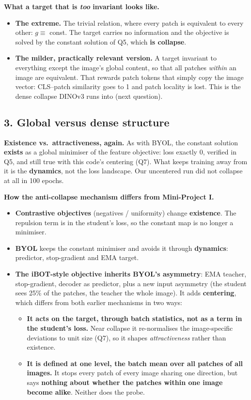 \documentclass[11pt]{article}
\begin{document}
\textbf{What a target that is \emph{too} invariant looks like.}
\begin{itemize}
  \item \textbf{The extreme.} The trivial relation, where every patch is equivalent to every other: $g\equiv$ const. The target carries no information and the objective is solved by the constant solution of Q5, which \textbf{is collapse}.
  \item \textbf{The milder, practically relevant version.} A target invariant to everything except the image's global content, so that all patches \emph{within} an image are equivalent. That rewards patch tokens that simply copy the image vector: CLS--patch similarity goes to 1 and patch locality is lost. This is the dense collapse DINOv3 runs into (next question).
\end{itemize}

\subsection*{3. Global versus dense structure}
\textbf{Existence vs.\ attractiveness, again.} As with BYOL, the constant solution \textbf{exists} as a global minimiser of the feature objective: loss exactly 0, verified in Q5, and still true with this code's centering (Q7). What keeps training away from it is the \textbf{dynamics}, not the loss landscape. Our uncentered run did not collapse at all in 100 epochs.

\textbf{How the anti-collapse mechanism differs from Mini-Project I.}
\begin{itemize}
  \item \textbf{Contrastive objectives} (negatives / uniformity) change \textbf{existence}. The repulsion term is in the student's loss, so the constant map is no longer a minimiser.
  \item \textbf{BYOL} keeps the constant minimiser and avoids it through \textbf{dynamics}: predictor, stop-gradient and EMA target.
  \item \textbf{The iBOT-style objective inherits BYOL's asymmetry}: EMA teacher, stop-gradient, decoder as predictor, plus a new input asymmetry (the student sees 25\% of the patches, the teacher the whole image). It adds \textbf{centering}, which differs from both earlier mechanisms in two ways:
  \begin{itemize}
    \item \textbf{It acts on the target, through batch statistics, not as a term in the student's loss.} Near collapse it re-normalises the image-specific deviations to unit size (Q7), so it shapes \emph{attractiveness} rather than existence.
    \item \textbf{It is defined at one level, the batch mean over all patches of all images.} It stops every patch of every image sharing one direction, but says \textbf{nothing about whether the patches within one image become alike}. Neither does the probe.
  \end{itemize}
\end{itemize}
\end{document}

